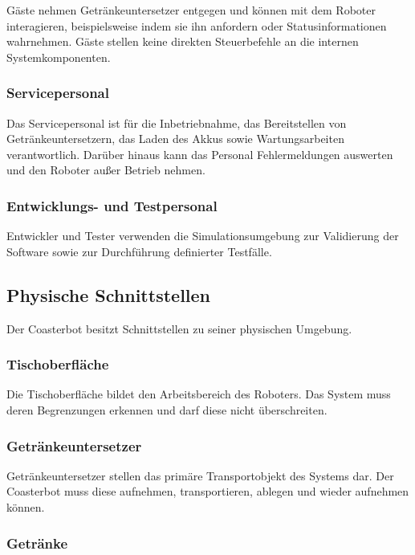 \documentclass[
  a4paper,
  12pt,
  DIV=12,        %
  parskip=half,  %
  headings=small %
]{scrartcl}
\theoremstyle{definition}
\theoremstyle{definition}
\begin{document}
Gäste nehmen Getränkeuntersetzer entgegen und können mit dem Roboter
interagieren, beispielsweise indem sie ihn anfordern oder
Statusinformationen wahrnehmen. Gäste stellen keine direkten
Steuerbefehle an die internen Systemkomponenten.

\subsubsection{Servicepersonal}\label{servicepersonal-1}

Das Servicepersonal ist für die Inbetriebnahme, das Bereitstellen von
Getränkeuntersetzern, das Laden des Akkus sowie Wartungsarbeiten
verantwortlich. Darüber hinaus kann das Personal Fehlermeldungen
auswerten und den Roboter außer Betrieb nehmen.

\subsubsection{Entwicklungs- und
Testpersonal}\label{entwicklungs--und-testpersonal}

Entwickler und Tester verwenden die Simulationsumgebung zur Validierung
der Software sowie zur Durchführung definierter Testfälle.

\subsection{Physische Schnittstellen}\label{physische-schnittstellen}

Der Coasterbot besitzt Schnittstellen zu seiner physischen Umgebung.

\subsubsection{Tischoberfläche}\label{tischoberfluxe4che}

Die Tischoberfläche bildet den Arbeitsbereich des Roboters. Das System
muss deren Begrenzungen erkennen und darf diese nicht überschreiten.

\subsubsection{Getränkeuntersetzer}\label{getruxe4nkeuntersetzer}

Getränkeuntersetzer stellen das primäre Transportobjekt des Systems dar.
Der Coasterbot muss diese aufnehmen, transportieren, ablegen und wieder
aufnehmen können.

\subsubsection{Getränke}\label{getruxe4nke}
\end{document}
